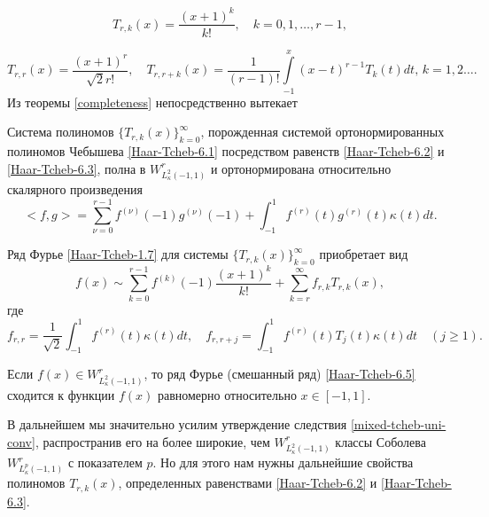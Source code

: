   \begin{equation}\label{Haar-Tcheb-6.2}
T_{r,k}(x) =\frac{(x+1)^k}{k!}, \quad k=0,1,\ldots, r-1,
\end{equation}

  \begin{equation}\label{Haar-Tcheb-6.3}
 T_{r,r}(x) =\frac{(x+1)^r}{\sqrt{2}r!},\quad T_{r,r+k}(x) =\frac{1}{(r-1)!}\int\limits_{-1}^x(x-t)^{r-1}T_k(t)dt, \, k=1,2\ldots.
\end{equation}
Из теоремы \ref{completeness} непосредственно вытекает
\begin{corollary}
  Система полиномов $\{T_{r,k}(x)\}_{k=0}^\infty$, порожденная системой ортонормированных полиномов Чебышева \eqref{Haar-Tcheb-6.1} посредством равенств \eqref{Haar-Tcheb-6.2} и \eqref{Haar-Tcheb-6.3}, полна  в $W^r_{L^2_\kappa(-1,1)}$ и ортонормирована относительно скалярного произведения
\begin{equation}\label{Haar-Tcheb-6.4}
<f,g>=\sum_{\nu=0}^{r-1}f^{(\nu)}(-1)g^{(\nu)}(-1)+\int_{-1}^{1} f^{(r)}(t)g^{(r)}(t)\kappa(t) dt.
\end{equation}
\end{corollary}

Ряд Фурье \eqref{Haar-Tcheb-1.7} для системы   $\{T_{r,k}(x)\}_{k=0}^\infty$ приобретает вид
\begin{equation}\label{Haar-Tcheb-6.5}
f(x)\sim \sum_{k=0}^{r-1} f^{(k)}(-1)\frac{(x+1)^k}{k!}+ \sum_{k=r}^\infty f_{r,k}T_{r,k}(x),
\end{equation}
где
  \begin{equation}\label{Haar-Tcheb-6.6}
f_{r,r}=\frac{1}{\sqrt{2}}\int_{-1}^1 f^{(r)}(t)\kappa(t)dt,\quad f_{r,r+j}=\int_{-1}^1 f^{(r)}(t)T_{j}(t)\kappa(t)dt\quad(j\ge1).
\end{equation}

\begin{corollary}\label{mixed-tcheb-uni-conv}
 Если $f(x)\in W^r_{L^2_\kappa(-1,1)}$, то ряд Фурье (смешанный ряд) \eqref{Haar-Tcheb-6.5} сходится к функции $f(x)$ равномерно относительно $x\in[-1,1]$.
\end{corollary}

В дальнейшем мы значительно усилим утверждение следствия \ref{mixed-tcheb-uni-conv}, распространив его на более широкие, чем $W^r_{L^2_\kappa(-1,1)}$ классы Соболева $W^r_{L^{p}_\kappa(-1,1)}$ с показателем $p$. Но для этого нам нужны дальнейшие свойства полиномов $T_{r,k}(x)$, определенных равенствами \eqref{Haar-Tcheb-6.2} и \eqref{Haar-Tcheb-6.3}.

